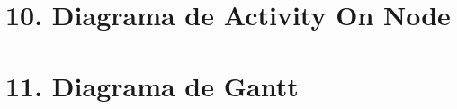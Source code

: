 \documentclass[
11pt, %
]{charter}
\begin{document}
\section{10. Diagrama de Activity On Node}
\label{sec:AoN}

%
%
%

%



\section{11. Diagrama de Gantt}
\label{sec:gantt}
\end{document}
